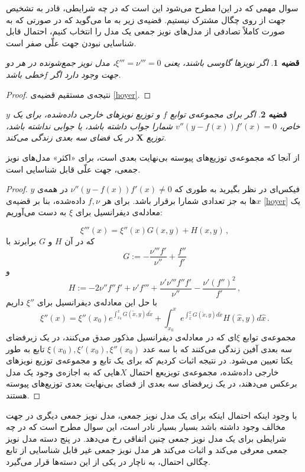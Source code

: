 \documentclass[a4paper,12pt]{article}
\newtheorem{thm}{{\large\bf قضیه}}[section]
\def\hat{\widehat}
\begin{document}
سوال مهمی که در این‌ا مطرح می‌شود این است که در چه شرایطی، قادر به تشخیص جهت از روی چگال مشترک نیستیم. قضیه‌ی زیر به ما می‌گوید که در صورتی که به صورت کاملاً تصادفی از مدل‌های نویز جمعی یک مدل را انتخاب کنیم، احتمال قابل شناسایی نبودن جهت علّی صفر است.

\begin{thm}
اگر نویزها گاوسی باشند، یعنی
$\xi''' = \nu''' = 0$،
مدل نویز جمع‌شونده در هر دو جهت وجود دارد اگر $f$خطی باشد.
\end{thm}
\begin{proof}
	نتیجه‌ی مستقیم قضیه‌ی
	\eqref{hoyer}.
\end{proof}
\begin{thm}
	اگر برای مجموعه‌ی توابع $f$ و توزیع نویز‌های خارجی داده‌شده، برای یک $y$ خاص،
	$v''(y-f(x))f'(x)=0$
	شمارا جواب داشته باشد، یا جوابی نداشته باشد، توزیع 
	$\textbf{X}$
	در یک فضای سه بعدی زندگی می‌کند.
\end{thm}
از آنجا که مجموعه‌ی توزیع‌های پیوسته بی‌نهایت بعدی است، برای «اکثر»  مدل‌‌های نویز جمعی، جهت علّی قابل شناسایی است.
\vspace{0.5cm}
\begin{proof}
	$y$ 
	فیکس‌ای در نظر بگیرید به طوری که 
	$\nu''(y-f(x))f'(x)\neq 0$ 
	در همه‌ی $x$ها به جز تعدادی شمارا برقرار باشد. برای هر $f,\nu$ داده‌شده، بنا بر قضیه‌ی 
	\ref{hoyer}
	یک معادله‌ی دیفرانسیل برای $\xi$ به دست می‌آوریم:
	
	\begin{equation}\label{DGLmitG}
	\xi'''(x)=\xi''(x) G(x,y) +H(x,y)  \,,
	\end{equation}
	که در آن $H$ و $G$ برابرند با
	$$
	G:= -\frac{\nu'''f'}{\nu''}+\frac{f''}{f'}
	$$
	و
	$$ 
	H:= -2\nu''f''f' +\nu'f'''+\frac{\nu'\nu'''f''f'}{\nu''}-\frac{\nu'(f'')^2}{f'} \,,
	$$
	با حل این معادله‌ی دیفرانسیل برای $\xi''$ داریم
	\begin{equation}\label{rInt}
	\xi''(x)=\xi''(x_0) e^{\int_{x_0}^x G(\tilde{x},y) d\tilde{x}}	
	+\int_{x_0}^x  e^{\int_{\hat{x}}^x G(\tilde{x},y)d\tilde{x}} 
	H(\hat{x},y) d\hat{x}\,.
	\end{equation}
	مجموعه‌ی توابع $\xi$ای که در معادله‌ی دیفرانسیل مذکور صدق می‌کنند، در یک زیرفضای سه بعدی آفین زندگی می‌کنند که با سه عدد 
	$\xi(x_0),\xi'(x_0),\xi''(x_0)$ 
	تابع به طور یکتا تعیین می‌شود. در نتیجه اثبات کردیم که برای یک تابع و مجموعه‌ی توزیع نویز‌های خارجی داده‌شده، مجموعه‌ی تویزیعع احتمال $X$هایی که به اجازه‌ی وجود یک مدل برعکس می‌دهند، در یک زیرفضای سه بعدی از فضای بی‌نهایت بعدی توزیع‌های پیوسته هستند.
\end{proof}
با وجود اینکه احتمال اینکه برای یک مدل نویز جمعی، مدل نویز جمعی دیگری در جهت مخالف وجود داشته باشد بسیار بسیار نادر است، این سوال مطرح است که در چه شرایطی برای یک مدل نویز جمعی چنین اتفاقی رخ می‌دهد.
در 
\cite{postnonlinear}
پنج دسته مدل نویز جمعی معرفی می‌کند و اثبات می‌کند هر مدل نویز جمعی غیر قابل شناسایی از تابع چگالی احتمال، به ناچار در یکی از این دسته‌ها قرار می‌گیرد.
\end{document}
